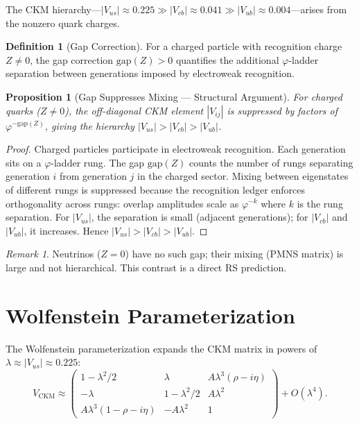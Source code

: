 \documentclass[12pt,a4paper]{article}
\newtheorem{proposition}[theorem]{Proposition}
\theoremstyle{definition}
\newtheorem{definition}[theorem]{Definition}
\theoremstyle{remark}
\newtheorem{remark}[theorem]{Remark}
\begin{document}
The CKM hierarchy---$|V_{us}| \approx 0.225 \gg |V_{cb}| \approx
0.041 \gg |V_{ub}| \approx 0.004$---arises from the nonzero quark
charges.

\begin{definition}[Gap Correction]
\label{def:gap}
For a charged particle with recognition charge $Z \neq 0$, the gap
correction $\mathrm{gap}(Z) > 0$ quantifies the additional
$\varphi$-ladder separation between generations imposed by
electroweak recognition.
\end{definition}

\begin{proposition}[Gap Suppresses Mixing --- Structural Argument]
\label{thm:gap-suppress}
For charged quarks ($Z \neq 0$), the off-diagonal CKM element $|V_{ij}|$
is suppressed by factors of $\varphi^{-\mathrm{gap}(Z)}$, giving the
hierarchy $|V_{us}| > |V_{cb}| > |V_{ub}|$.
\end{proposition}

\begin{proof}
Charged particles participate in electroweak recognition.  Each
generation sits on a $\varphi$-ladder rung.  The gap
$\mathrm{gap}(Z)$ counts the number of rungs separating generation
$i$ from generation $j$ in the charged sector.  Mixing between
eigenstates of different rungs is suppressed because the
recognition ledger enforces orthogonality across rungs: overlap
amplitudes scale as $\varphi^{-k}$ where $k$ is the rung
separation.  For $|V_{us}|$, the separation is small (adjacent
generations); for $|V_{cb}|$ and $|V_{ub}|$, it increases.  Hence
$|V_{us}| > |V_{cb}| > |V_{ub}|$.
\end{proof}

\begin{remark}
Neutrinos ($Z = 0$) have no such gap; their mixing (PMNS matrix) is
large and not hierarchical.  This contrast is a direct RS
prediction.
\end{remark}

\section{Wolfenstein Parameterization}
\label{sec:wolfenstein}

The Wolfenstein parameterization expands the CKM matrix in powers of
$\lambda \approx |V_{us}| \approx 0.225$:
\begin{equation}
  V_{\mathrm{CKM}} \approx
  \begin{pmatrix}
    1 - \lambda^2/2 & \lambda & A\lambda^3(\rho - i\eta) \\
    -\lambda & 1 - \lambda^2/2 & A\lambda^2 \\
    A\lambda^3(1 - \rho - i\eta) & -A\lambda^2 & 1
  \end{pmatrix} + O(\lambda^4).
\end{equation}
\end{document}
